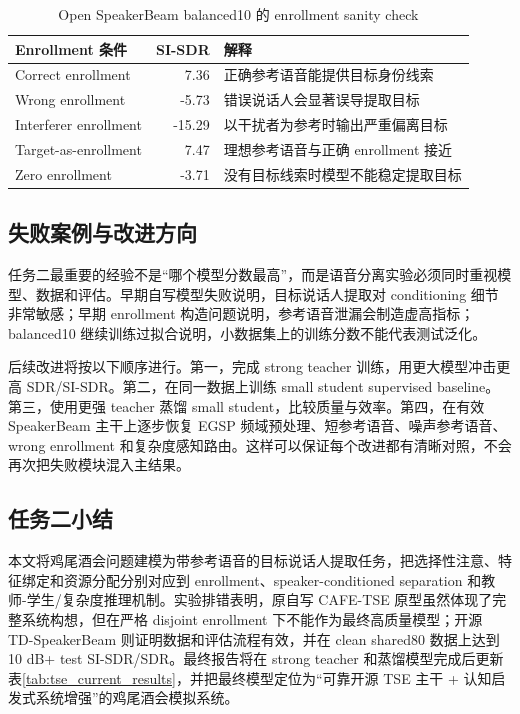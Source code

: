\documentclass[UTF8,zihao=-4,a4paper]{ctexart}
\begin{document}
\begin{table}[htbp]
\centering
\begin{tabular}{lrp{7.2cm}}
\toprule
Enrollment 条件 & SI-SDR & 解释 \\
\midrule
Correct enrollment & 7.36 & 正确参考语音能提供目标身份线索 \\
Wrong enrollment & -5.73 & 错误说话人会显著误导提取目标 \\
Interferer enrollment & -15.29 & 以干扰者为参考时输出严重偏离目标 \\
Target-as-enrollment & 7.47 & 理想参考语音与正确 enrollment 接近 \\
Zero enrollment & -3.71 & 没有目标线索时模型不能稳定提取目标 \\
\bottomrule
\end{tabular}
\caption{Open SpeakerBeam balanced10 的 enrollment sanity check}
\label{tab:enrollment_sanity}
\end{table}

\subsection{失败案例与改进方向}

任务二最重要的经验不是“哪个模型分数最高”，而是语音分离实验必须同时重视模型、数据和评估。早期自写模型失败说明，目标说话人提取对 conditioning 细节非常敏感；早期 enrollment 构造问题说明，参考语音泄漏会制造虚高指标；balanced10 继续训练过拟合说明，小数据集上的训练分数不能代表测试泛化。

后续改进将按以下顺序进行。第一，完成 strong teacher 训练，用更大模型冲击更高 SDR/SI-SDR。第二，在同一数据上训练 small student supervised baseline。第三，使用更强 teacher 蒸馏 small student，比较质量与效率。第四，在有效 SpeakerBeam 主干上逐步恢复 EGSP 频域预处理、短参考语音、噪声参考语音、wrong enrollment 和复杂度感知路由。这样可以保证每个改进都有清晰对照，不会再次把失败模块混入主结果。

\subsection{任务二小结}

本文将鸡尾酒会问题建模为带参考语音的目标说话人提取任务，把选择性注意、特征绑定和资源分配分别对应到 enrollment、speaker-conditioned separation 和教师-学生/复杂度推理机制。实验排错表明，原自写 CAFE-TSE 原型虽然体现了完整系统构想，但在严格 disjoint enrollment 下不能作为最终高质量模型；开源 TD-SpeakerBeam 则证明数据和评估流程有效，并在 clean shared80 数据上达到 10 dB+ test SI-SDR/SDR。最终报告将在 strong teacher 和蒸馏模型完成后更新表\ref{tab:tse_current_results}，并把最终模型定位为“可靠开源 TSE 主干 + 认知启发式系统增强”的鸡尾酒会模拟系统。
\end{document}
